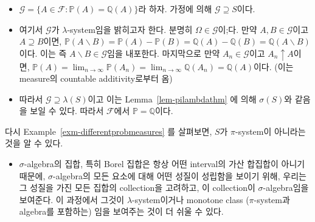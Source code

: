 \documentclass[
  letterpaper,
  DIV=11,
  numbers=noendperiod]{scrreprt}
\providecommand{\tightlist}{%
  \setlength{\itemsep}{0pt}\setlength{\parskip}{0pt}}
\theoremstyle{definition}
\theoremstyle{plain}
\theoremstyle{plain}
\theoremstyle{definition}
\theoremstyle{plain}
\theoremstyle{definition}
\theoremstyle{remark}
\begin{document}
\begin{tcolorbox}[enhanced jigsaw, left=2mm, arc=.35mm, leftrule=.75mm, colback=white, title=\textcolor{quarto-callout-note-color}{\faInfo}\hspace{0.5em}{Proof}, rightrule=.15mm, breakable, bottomrule=.15mm, coltitle=black, opacitybacktitle=0.6, opacityback=0, toptitle=1mm, titlerule=0mm, toprule=.15mm, colbacktitle=quarto-callout-note-color!10!white, bottomtitle=1mm, colframe=quarto-callout-note-color-frame]

\begin{itemize}
\item
  \(\mathcal{G} =\{A \in \mathcal{F}: \mathbb{P}(A) = \mathbb{Q}(A)\}\)라
  하자. 가정에 의해 \(\mathcal{G} \supseteq S\)이다.
\item
  여기서 \(\mathcal{G}\)가 \(\lambda\)-system임을 밝히고자 한다. 분명히
  \(\Omega \in \mathcal{G}\)이;다. 만약 \(A, B \in \mathcal{G}\)이고
  \(A \supseteq B\)이면,
  \(\mathbb{P}(A\backslash B) = \mathbb{P}(A) - \mathbb{P}(B) = \mathbb{Q}(A) - \mathbb{Q}(B) = \mathbb{Q}(A\backslash B)\)이다.
  이는 즉 \(A \backslash B \in \mathcal{G}\)임을 내포한다. 마지막으로
  만약 \(A_n \in \mathcal{G}\)이고 \(A_n \uparrow A\)이면,
  \(\mathbb{P}(A) = \lim_{n\rightarrow \infty} \mathbb{P}(A_n) = \lim_{n\rightarrow \infty}\mathbb{Q}(A_n) = \mathbb{Q}(A)\)이다.
  (이는 measure의 countable additivity로부터 옴)
\item
  따라서 \(\mathcal{G} \supseteq \lambda (S)\)이고 이는
  Lemma~\ref{lem-pilambdathm} 에 의해 \(\sigma (S)\)와 같음을 보일 수
  있다. 따라서 \(\mathcal{F}\)에서 \(\mathbb{P}= \mathbb{Q}\)이다.
\end{itemize}

\end{tcolorbox}

다시 Example~\ref{exm-differentprobmeasures} 를 살펴보면, \(S\)가
\(\pi\)-system이 아니라는 것을 알 수 있다.

\begin{tcolorbox}[enhanced jigsaw, left=2mm, arc=.35mm, leftrule=.75mm, colback=white, title=\textcolor{quarto-callout-tip-color}{\faLightbulb}\hspace{0.5em}{Remark}, rightrule=.15mm, breakable, bottomrule=.15mm, coltitle=black, opacitybacktitle=0.6, opacityback=0, toptitle=1mm, titlerule=0mm, toprule=.15mm, colbacktitle=quarto-callout-tip-color!10!white, bottomtitle=1mm, colframe=quarto-callout-tip-color-frame]

\begin{itemize}
\tightlist
\item
  \(\sigma\)-algebra의 집합, 특히 Borel 집합은 항상 어떤 interval의 가산
  합집합이 아니기 때문에, \(\sigma\)-algebra의 모든 요소에 대해 어떤
  성질이 성립함을 보이기 위해, 우리는 그 성질을 가진 모든 집합의
  collection을 고려하고, 이 collection이 \(\sigma\)-algebra임을
  보여준다. 이 과정에서 그것이 \(\lambda\)-system이거나 monotone class
  (\(\pi\)-system과 algebra를 포함하는) 임을 보여주는 것이 더 쉬울 수
  있다.
\end{itemize}

\end{tcolorbox}
\end{document}
